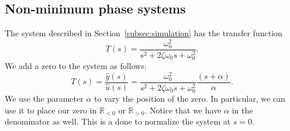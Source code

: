 \subsection{Non-minimum phase systems}\label{NMP}

The system described in Section~\ref{subsec:simulation} has the transfer
function
\begin{equation*}
    T(s)=\frac{\omega_{0}^{2}}{s^{2}+2\zeta\omega_{0}s+\omega_{0}^{2}}.
\end{equation*}
We add a zero to the system as follows:
\begin{equation*}
    T(s)=\frac{\hat y(s)}{\hat u(s)}=
    \frac{\omega_{0}^{2}}{s^{2}+2\zeta\omega_{0}s+
        \omega_{0}^{2}}\frac{(s+\alpha)}{\alpha}.
\end{equation*}
We use the parameter \(\alpha \) to vary the position of the zero.  In
particular, we can use it to place our zero in \(\mathbb{R}_{<0} \) or
\(\mathbb{R}_{>0}\).  Notice that we have \(\alpha \) in the denominator as
well.  This is a done to normalize the system at \(s=0\).

